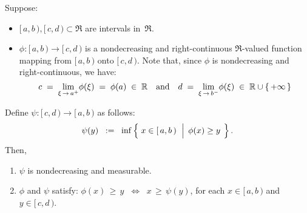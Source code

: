 
\begin{lemma}\label{lemma:nondecreasingRightContinuous}
\mbox{}\vskip 0.1cm
\noindent
Suppose:
\begin{itemize}
\item
	$[\,a,b\,), [\,c,d\,) \subset \Re$ are intervals in \,$\Re$.
\item
	$\phi : [\,a,b\,) \longrightarrow [\,c,d\,)$ is a nondecreasing and right-continuous
	$\Re$-valued function mapping from $[\,a,b\,)$ {\color{red}onto} $[\,c,d\,)$.
	Note that, since $\phi$ is nondecreasing and right-continuous, we have:
	\begin{equation*}
	c \; = \; \underset{\xi\,\rightarrow\,a^{+}}{\lim}\phi(\xi) \; = \; \phi(a) \; \in \; \Re
	\quad\textnormal{and}\quad
	d \; = \; \underset{\xi\,\rightarrow\,b^{-}}{\lim}\phi(\xi) \; \in \; \Re\cup\{\,+\infty\,\}
	\end{equation*}
\end{itemize}
Define \;$\psi : [\,c,d\,) \longrightarrow [\,a,b\,)$\; as follows:
\begin{equation*}
\psi(y)
\;\; := \;\;
	\inf\left\{\;
		x \in [\,a,b\,)
	\,\;\left\vert\;\,
		\overset{{\color{white}.}}{\phi}(x) \geq y
	\right.
	\;\right\}.
\end{equation*}
Then,
\begin{enumerate}
\item
	$\psi$ is nondecreasing and measurable.
\item
	$\phi$ and $\psi$ satisfy:\quad
	$\phi(x) \,\geq\, y \;\; \Longleftrightarrow \;\; x \,\geq\, \psi(y)$,\;\;
	for each \;$x \in [\,a,b\,)$\; and \;$y \in [\,c,d\,)$.
\end{enumerate}
\end{lemma}
\proof
